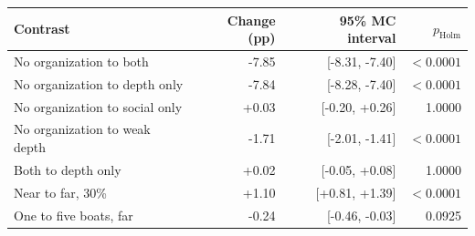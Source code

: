 \begin{tabular}{lrrr}
\toprule
Contrast & Change (pp) & 95\% MC interval & $p_{\mathrm{Holm}}$ \\
\midrule
No organization to both & -7.85 & [-8.31, -7.40] & $<0.0001$ \\
No organization to depth only & -7.84 & [-8.28, -7.40] & $<0.0001$ \\
No organization to social only & +0.03 & [-0.20, +0.26] & 1.0000 \\
No organization to weak depth & -1.71 & [-2.01, -1.41] & $<0.0001$ \\
Both to depth only & +0.02 & [-0.05, +0.08] & 1.0000 \\
Near to far, 30\% & +1.10 & [+0.81, +1.39] & $<0.0001$ \\
One to five boats, far & -0.24 & [-0.46, -0.03] & 0.0925 \\
\bottomrule
\end{tabular}

